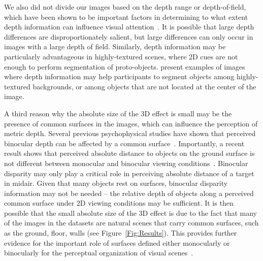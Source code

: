 We also did not divide our images based on the depth range or depth-of-field, which have been shown to be important factors in determining to what extent depth information can influence visual
attention~\citep{Lang_etal12}. It is possible that large depth differences are disproportionately salient, but large differences can only occur in images with a large depth of field. Similarly, depth information may be particularly advantageous in highly-textured scenes, where 2D cues are not enough to perform segmentation of proto-objects. \cite{Ma_Hang15} present examples of images where depth information may help participants to segment objects among highly-textured backgrounds, or among objects that are not located at the center of the image.

A third reason why the absolute size of the 3D effect is small may be
the presence of common surfaces in the images, which can influence the
perception of metric depth. Several previous psychophysical studies
have shown that perceived binocular depth can be affected by a common
surface~\citep{McKee_83,Glennerster_McKee99,He_Ooi00}. Importantly, a
recent result shows that perceived absolute distance to objects on the
ground surface is not different between monocular and binocular viewing conditions~\citep{Ooi_He15}. Binocular disparity may only play a critical role in perceiving absolute distance of a target in midair.
Given that many objects rest on surfaces, binocular disparity information may not be needed -- the relative depth of objects along a perceived common surface under 2D viewing conditions may be sufficient. It is then possible that the small absolute size of the 3D effect is due to the fact that many of the images in the datasets are natural scenes that carry common surfaces, such as the ground, floor, walls \etc (see Figure~\ref{Fig:Results}). This provides further evidence for the important role of surfaces defined either monocularly or binocularly for the perceptual organization of visual scenes~\citep{He_Nakayama92,He_Nakayama95,Hu_etal15a}.

